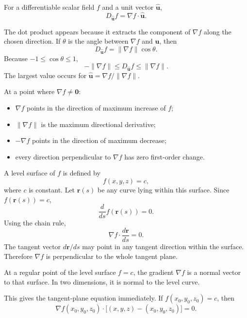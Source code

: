 \begin{bookdefinition}
For a differentiable scalar field $f$ and a unit vector $\hat{\mathbf u}$,
\[
\boxed{D_{\hat{\mathbf u}}f=\nabla f\cdot\hat{\mathbf u}.}
\]
\end{bookdefinition}

The dot product appears because it extracts the component of $\nabla f$ along the chosen direction. If $\theta$ is the angle between $\nabla f$ and $\hat{\mathbf u}$, then
\[
D_{\hat{\mathbf u}}f
=
\lVert\nabla f\rVert\cos\theta.
\]
Because $-1\leq\cos\theta\leq1$,
\[
-\lVert\nabla f\rVert
\leq
D_{\hat{\mathbf u}}f
\leq
\lVert\nabla f\rVert.
\]
The largest value occurs for $\hat{\mathbf u}=\nabla f/\lVert\nabla f\rVert$.

\begin{bookproperty}
At a point where $\nabla f\neq\mathbf0$:
\begin{itemize}
\item $\nabla f$ points in the direction of maximum increase of $f$;
\item $\lVert\nabla f\rVert$ is the maximum directional derivative;
\item $-\nabla f$ points in the direction of maximum decrease;
\item every direction perpendicular to $\nabla f$ has zero first-order change.
\end{itemize}
\end{bookproperty}


A level surface of $f$ is defined by
\[
f(x,y,z)=c,
\]
where $c$ is constant. Let $\mathbf r(s)$ be any curve lying within this surface. Since $f(\mathbf r(s))=c$,
\[
\frac{d}{ds}f(\mathbf r(s))=0.
\]
Using the chain rule,
\[
\nabla f\cdot\frac{d\mathbf r}{ds}=0.
\]
The tangent vector $d\mathbf r/ds$ may point in any tangent direction within the surface. Therefore $\nabla f$ is perpendicular to the whole tangent plane.

\begin{bookproperty}
At a regular point of the level surface $f=c$, the gradient $\nabla f$ is a normal vector to that surface. In two dimensions, it is normal to the level curve.
\end{bookproperty}

This gives the tangent-plane equation immediately. If $f(x_0,y_0,z_0)=c$, then
\[
\boxed{
\nabla f(x_0,y_0,z_0)\cdot
\bigl[(x,y,z)-(x_0,y_0,z_0)\bigr]=0.
}
\]

